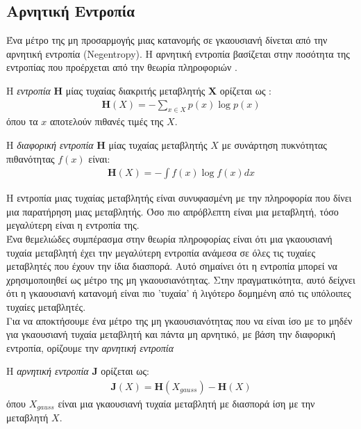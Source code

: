 \subsection{Αρνητική Εντροπία} \label{sec:3.2.2}
Ένα μέτρο της μη προσαρμογής μιας κατανομής σε γκαουσιανή δίνεται από την αρνητική εντροπία (\en Negentropy). \gr Η αρνητική εντροπία βασίζεται στην ποσότητα της εντροπίας που προέρχεται από την θεωρία πληροφοριών \cite{entropy:9}.
\begin{definition} \label{def:3.1}
Η \emph{εντροπία} \en $\mathbf{H}$ \gr μίας τυχαίας διακριτής μεταβλητής \en $\mathbf{X}$ \gr ορίζεται ως : 
\begin{align*}
    \mathbf{H}(X) = -\sum\limits_{x \in X} p(x) \log p(x)
\end{align*}
\gr όπου τα \en $x$ \gr αποτελούν πιθανές τιμές της \en $X$. 
\end{definition}
\begin{definition} \label{def:3.2}
Η \emph{διαφορική εντροπία} \en $\mathbf{H}$ \gr μίας τυχαίας μεταβλητής \en $X$ \gr με συνάρτηση πυκνότητας πιθανότητας \en $f(x)$ \gr είναι:
\begin{align*}
    \mathbf{H}(X) = - \int f(x) \log f(x) dx
\end{align*}
\end{definition}
\gr Η εντροπία μιας τυχαίας μεταβλητής είναι συνυφασμένη με την πληροφορία που δίνει μια παρατήρηση μιας μεταβλητής. Όσο πιο απρόβλεπτη είναι μια μεταβλητή, τόσο μεγαλύτερη είναι η εντροπία της.
\\ [0.5 \baselineskip]
Ένα θεμελιώδες συμπέρασμα στην θεωρία πληροφορίας είναι ότι μια γκαουσιανή τυχαία μεταβλητή έχει την μεγαλύτερη εντροπία ανάμεσα σε όλες τις τυχαίες μεταβλητές που έχουν την ίδια διασπορά. Αυτό σημαίνει ότι η εντροπία μπορεί να χρησιμοποιηθεί ως μέτρο της μη γκαουσιανότητας. Στην πραγματικότητα, αυτό δείχνει ότι η γκαουσιανή κατανομή είναι πιο 'τυχαία' ή λιγότερο δομημένη από τις υπόλοιπες τυχαίες μεταβλητές.
\\ [0.5 \baselineskip]
Για να αποκτήσουμε ένα μέτρο της μη γκαουσιανότητας που να είναι ίσο με το μηδέν για γκαουσιανή τυχαία μεταβλητή και πάντα μη αρνητικό, με βάση την διαφορική εντροπία, ορίζουμε την \emph{αρνητική εντροπία}
\begin{definition} \label{def:3.3}
Η \emph{αρνητική εντροπία} \en $\mathbf{J}$ \gr ορίζεται ως: \en
\begin{align*}
    \mathbf{J}(X) = \mathbf{H}(X_{gauss}) - \mathbf{H}(X)
\end{align*}
\gr όπου \en $X_{gauss}$ \gr είναι μια γκαουσιανή τυχαία μεταβλητή με διασπορά ίση με την μεταβλητή \en $X$.
\end{definition}
